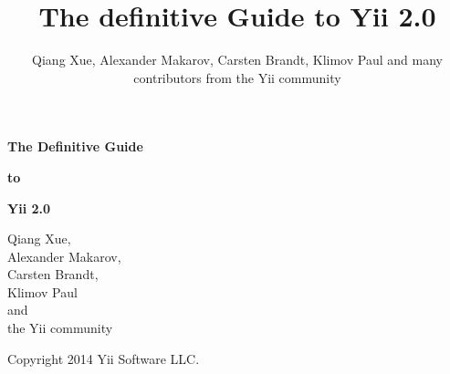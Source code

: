 \documentclass[a4paper,11pt,twoside]{book}
\title{The definitive Guide to Yii 2.0}
\author{
    Qiang Xue,
    Alexander Makarov,
    Carsten Brandt,
    Klimov Paul
    and
    many contributors from the Yii community
}
\begin{document}
    \frontmatter

    \begin{titlepage}
        \setlength{\oddsidemargin}{-1in}
        \setlength{\evensidemargin}{-1in}
        \setlength{\textwidth}{\paperwidth}

        \vspace*{\fill}

        \noindent
        \parbox{\textwidth}{\centering \bfseries \Huge
            The Definitive Guide
        }\vspace{.5cm}
        \parbox{\textwidth}{\centering \bfseries \Huge
            to
        }\vspace{.5cm}
        \parbox{\textwidth}{\centering \bfseries \Huge
            Yii 2.0
        }

        \vfill

        \noindent
        \parbox{\textwidth}{\centering \Large
            Qiang Xue,\\
            Alexander Makarov,\\
            Carsten Brandt,\\
            Klimov Paul\\
            and\\
            the Yii community
        }

        \vspace*{\fill}

        \noindent
        \parbox{\textwidth}{\centering
            Copyright 2014 Yii Software LLC.
        }
    \end{titlepage}

    \pagebreak \thispagestyle{empty} \cleardoublepage

    \setcounter{tocdepth}{1}
    \tableofcontents

    \mainmatter

	
\end{document}
